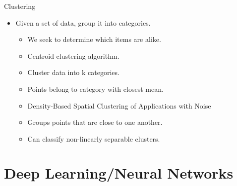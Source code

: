 \documentclass[11pt]{beamer}
\begin{document}
\begin{frame}{Clustering}
\begin{itemize}
    \item Given a set of data, group it into categories.
    \begin{itemize}
        \item We seek to determine which items are alike.
    \end{itemize}
    \begin{itemize}
        \item Centroid clustering algorithm.
        \item Cluster data into k categories.
        \item Points belong to category with closest mean.
    \end{itemize}
    \begin{itemize}
        \item Density-Based Spatial Clustering of Applications with Noise
        \item Groups points that are close to one another.
        \item Can classify non-linearly separable clusters.
    \end{itemize}
\end{itemize}
\end{frame}

\section{Deep Learning/Neural Networks}
\end{document}
